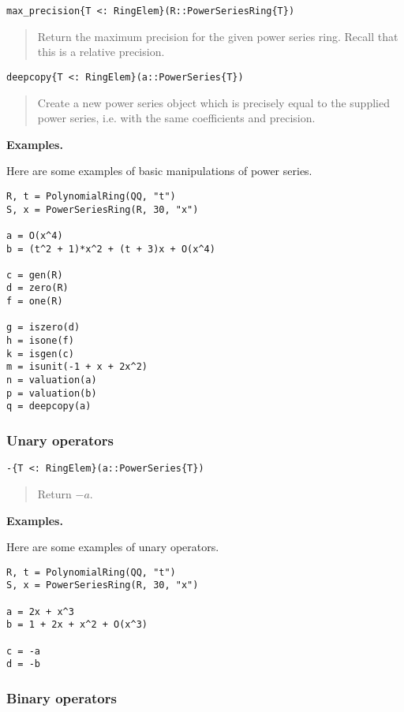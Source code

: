 \documentclass[a4paper,10pt]{article}
\newcommand{\desc}[1]{\vspace{-3mm}\begin{quote}#1\end{quote}}
\begin{document}
\begin{lstlisting}
max_precision{T <: RingElem}(R::PowerSeriesRing{T})
\end{lstlisting}

\desc{Return the maximum precision for the given power series ring. Recall
that this is a relative precision.}

\begin{lstlisting}
deepcopy{T <: RingElem}(a::PowerSeries{T})
\end{lstlisting}

\desc{Create a new power series object which is precisely equal to the
supplied power series, i.e. with the same coefficients and precision.}

\textbf{Examples.}

Here are some examples of basic manipulations of power series.

\begin{lstlisting}
R, t = PolynomialRing(QQ, "t")
S, x = PowerSeriesRing(R, 30, "x")

a = O(x^4)
b = (t^2 + 1)*x^2 + (t + 3)x + O(x^4)

c = gen(R)
d = zero(R)
f = one(R)

g = iszero(d)
h = isone(f)
k = isgen(c)
m = isunit(-1 + x + 2x^2)
n = valuation(a)
p = valuation(b)
q = deepcopy(a)
\end{lstlisting}

\subsubsection{Unary operators}

\begin{lstlisting}
-{T <: RingElem}(a::PowerSeries{T})
\end{lstlisting}

\desc{Return $-a$.}

\textbf{Examples.}

Here are some examples of unary operators.

\begin{lstlisting}
R, t = PolynomialRing(QQ, "t")
S, x = PowerSeriesRing(R, 30, "x")

a = 2x + x^3
b = 1 + 2x + x^2 + O(x^3)

c = -a
d = -b
\end{lstlisting}

\subsubsection{Binary operators}
\end{document}
